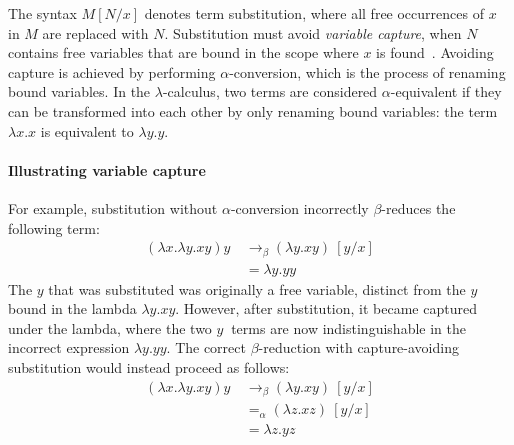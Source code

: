 \documentclass[../../../main.tex]{subfiles}
\begin{document}
The syntax $M[N/x]$ denotes term substitution, where all free occurrences of $x$ in $M$ are replaced with $N$.
Substitution must avoid \emph{variable capture}, when $N$ contains free variables that are bound in the scope where $x$ is found~\cite{van-bakel_tsfpl_2022}.
Avoiding capture is achieved by performing $\alpha$-conversion, which is the process of renaming bound variables.
In the $\lambda$-calculus, two terms are considered $\alpha$-equivalent if they can be transformed into each other by only renaming bound variables: the term $\lambda x. x$ is equivalent to $\lambda y. y$.

\paragraph{Illustrating variable capture}
For example, substitution without $\alpha$-conversion incorrectly $\beta$-reduces the following term:
\begin{align*}
(\lambda x. \lambda y. x y) y\ &\rightarrow_\beta (\lambda y. x y)\ [y / x] \\
&= \lambda y. y y
\end{align*}
The $y$ that was substituted was originally a free variable, distinct from the $y$ bound in the lambda $\lambda y. x y$.
However, after substitution, it became captured under the lambda, where the two $y\ $ terms are now indistinguishable in the incorrect expression $\lambda y. y y$.
The correct $\beta$-reduction with capture-avoiding substitution would instead proceed as follows:
\begin{align*}
(\lambda x. \lambda y. x y) y\ &\rightarrow_\beta (\lambda y. x y)\ [y / x] \\
&=_\alpha (\lambda z. x z)\ [y / x] \\
&= \lambda z. y z
\end{align*}
\end{document}
